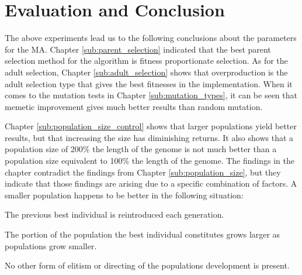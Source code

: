


\section{Evaluation and Conclusion} %
\label{sec:evaluation_and_conclusion}

The above experiments lead us to the following conclusions about the parameters for the MA. Chapter \ref{sub:parent_selection} indicated that the best parent selection method for the algorithm is fitness proportionate selection. As for the adult selection, Chapter \ref{sub:adult_selection} shows that overproduction is the adult selection type that gives the best fitnesses in the implementation. When it comes to the mutation tests in Chapter \ref{sub:mutation_types}, it can be seen that memetic improvement gives much better results than random mutation.

Chapter \ref{sub:population_size_control} shows that larger populations yield better results, but that increasing the size has diminishing returns. It also shows that a population size of 200\% the length of the genome is not much better than a population size equivalent to 100\% the length of the genome. The findings in the chapter contradict the findings from Chapter \ref{sub:population_size}, but they indicate that those findings are arising due to a specific combination of factors. A smaller population happens to be better in the following situation:

\begin{compactitem}
    \item The previous best individual is reintroduced each generation.
    \item The portion of the population the best individual constitutes grows larger as populations grow smaller.
    \item No other form of elitism or directing of the populations development is present.
\end{compactitem}

